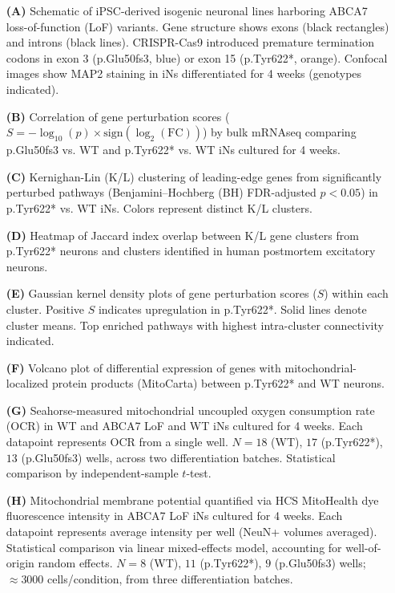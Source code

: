 \begin{itemize}
    \item[\textbf{(A)}] Schematic of iPSC-derived isogenic neuronal lines harboring ABCA7 loss-of-function (LoF) variants. Gene structure shows exons (black rectangles) and introns (black lines). CRISPR-Cas9 introduced premature termination codons in exon 3 (p.Glu50fs3, blue) or exon 15 (p.Tyr622*, orange). Confocal images show MAP2 staining in iNs differentiated for 4 weeks (genotypes indicated).
    \item[\textbf{(B)}] Correlation of gene perturbation scores ($S = -\log_{10}(p)\times\text{sign}(\log_2(\text{FC}))$) by bulk mRNAseq comparing p.Glu50fs3 vs. WT and p.Tyr622* vs. WT iNs cultured for 4 weeks.
    \item[\textbf{(C)}] Kernighan-Lin (K/L) clustering of leading-edge genes from significantly perturbed pathways (Benjamini–Hochberg (BH) FDR-adjusted $p<0.05$) in p.Tyr622* vs. WT iNs. Colors represent distinct K/L clusters.
    \item[\textbf{(D)}] Heatmap of Jaccard index overlap between K/L gene clusters from p.Tyr622* neurons and clusters identified in human postmortem excitatory neurons.
    \item[\textbf{(E)}] Gaussian kernel density plots of gene perturbation scores ($S$) within each cluster. Positive $S$ indicates upregulation in p.Tyr622*. Solid lines denote cluster means. Top enriched pathways with highest intra-cluster connectivity indicated.
    \item[\textbf{(F)}] Volcano plot of differential expression of genes with mitochondrial-localized protein products (MitoCarta) between p.Tyr622* and WT neurons.
    \item[\textbf{(G)}] Seahorse-measured mitochondrial uncoupled oxygen consumption rate (OCR) in WT and ABCA7 LoF and WT iNs cultured for 4 weeks. Each datapoint represents OCR from a single well. $N=18$ (WT), $17$ (p.Tyr622*), $13$ (p.Glu50fs3) wells, across two differentiation batches. Statistical comparison by independent-sample $t$-test.
    \item[\textbf{(H)}] Mitochondrial membrane potential quantified via HCS MitoHealth dye fluorescence intensity in ABCA7 LoF iNs cultured for 4 weeks. Each datapoint represents average intensity per well (NeuN+ volumes averaged). Statistical comparison via linear mixed-effects model, accounting for well-of-origin random effects. $N=8$ (WT), $11$ (p.Tyr622*), $9$ (p.Glu50fs3) wells; $\approx3000$ cells/condition, from three differentiation batches.

\end{itemize}

